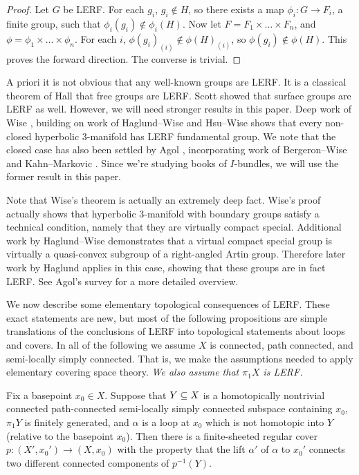 \begin{proof}

Let $G$ be LERF. For each $g_i$, $g_i \notin H$, so there exists a map $\phi_i
\colon G \to F_i$, a finite group, such that $\phi_i(g_i) \notin \phi_i(H)$.
Now let $F = F_1 \times \dots \times F_n$, and $\phi = \phi_1 \times \dots
\times \phi_n$.  For each $i$, $\phi(g_i)_{(i)} \notin \phi(H)_{(i)}$, so
$\phi(g_i) \notin \phi(H)$.  This proves the forward direction.  The converse
is trivial.

\end{proof}

A priori it is not obvious that any well-known groups are LERF. It is
a classical theorem of Hall \cite{Hall} that free groups are LERF. Scott
\cite{Scott} showed that surface groups are LERF as well. However, we will need
stronger results in this paper. Deep work of Wise \cite{Wise}, building on work
of Haglund--Wise \cite{HaglundWise} and Hsu--Wise \cite{HsuWise} shows that
every non-closed hyperbolic $3$-manifold has LERF fundamental group.  We note
that the closed case has also been settled by Agol \cite{Agol}, incorporating
work of Bergeron--Wise \cite{BergeronWise} and Kahn--Markovic \cite{KM}. Since
we're studying books of $I$-bundles, we will use the former result in this
paper.

Note that Wise's theorem is actually an extremely deep fact. Wise's proof
actually shows that hyperbolic $3$-manifold with boundary groups satisfy
a technical condition, namely that they are virtually compact special.
Additional work by Haglund--Wise \cite{HaglundWise1} demonstrates that
a virtual compact special group is virtually a quasi-convex subgroup of
a right-angled Artin group. Therefore later work by Haglund \cite{Haglund}
applies in this case, showing that these groups are in fact LERF. See Agol's
survey \cite{Agolsurvey} for a more detailed overview.

We now describe some elementary topological consequences of LERF. These exact
statements are new, but most of the following propositions are simple
translations of the conclusions of LERF into topological statements about loops
and covers. In all of the following we assume $X$ is connected, path connected,
and semi-locally simply connected. That is, we make the assumptions needed to
apply elementary covering space theory. \emph{We also assume that $\pi_1X$ is
LERF.}


\begin{prop}\label{P:lerf1}

Fix a basepoint $x_0 \in X$.  Suppose that $Y \subseteq X$ is a homotopically
nontrivial connected path-connected semi-locally simply connected subspace
containing $x_0$, $\pi_1Y$ is finitely generated, and $\alpha$ is a loop at
$x_0$ which is not homotopic into $Y$ (relative to the basepoint $x_0$). Then
there is a finite-sheeted regular cover $p \colon (X',x_0') \to (X,x_0)$ with
the property that the lift $\alpha'$ of $\alpha$ to $x_0'$ connects two
different connected components of $p^{-1}(Y)$.

\end{prop}


